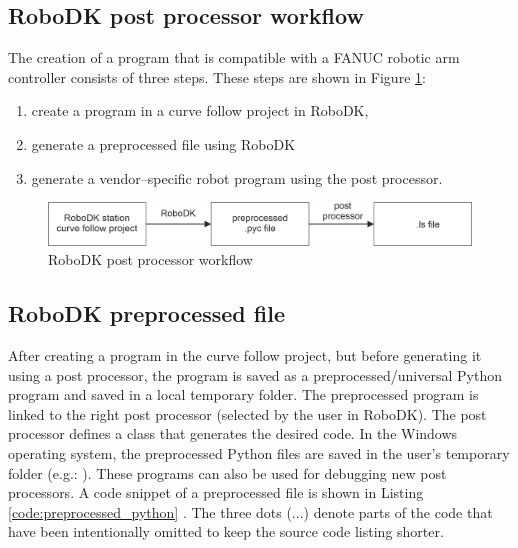 \subsection{RoboDK post processor workflow}

The creation of a program that is compatible with a FANUC robotic arm controller consists of three steps. These steps are shown in Figure \ref{workflow}:

\begin{enumerate}
  \item create a program in a curve follow project in RoboDK,   
  \item generate a preprocessed  file using RoboDK
  \item generate a vendor--specific robot  program using the post processor.
\end{enumerate}


\begin{figure}[h]
    \centering
    \includegraphics[width=0.9\linewidth]{img/workflow.jpg}
    \caption{RoboDK post processor workflow}
    \label{workflow}
\end{figure}


\subsection{RoboDK preprocessed file}

After creating a program in the curve follow project, but before generating it using a post processor, the program is saved as a preprocessed/universal Python program and saved in a local temporary folder. The preprocessed program is linked to the right post processor (selected by the user in RoboDK). The post processor defines a  class that generates the desired code. In the Windows operating system, the preprocessed Python files are saved in the user's temporary folder (e.g.: ). These programs can also be used for debugging new post processors. A code snippet of a preprocessed file is shown in Listing \ref{code:preprocessed_python} \cite{preprocessed}. The three dots (...) denote parts of the code that have been intentionally omitted to keep the source code listing shorter. 





